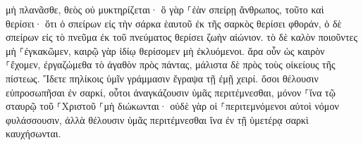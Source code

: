 \documentclass{openreader}
\begin{document}
μὴ πλανᾶσθε, θεὸς οὐ μυκτηρίζεται· ὃ γὰρ ⸀ἐὰν σπείρῃ ἄνθρωπος, τοῦτο καὶ θερίσει· 
ὅτι ὁ σπείρων εἰς τὴν σάρκα ἑαυτοῦ ἐκ τῆς σαρκὸς θερίσει φθοράν, ὁ δὲ σπείρων εἰς τὸ πνεῦμα ἐκ τοῦ πνεύματος θερίσει ζωὴν αἰώνιον. 
τὸ δὲ καλὸν ποιοῦντες μὴ ⸀ἐγκακῶμεν, καιρῷ γὰρ ἰδίῳ θερίσομεν μὴ ἐκλυόμενοι. 
ἄρα οὖν ὡς καιρὸν ⸀ἔχομεν, ἐργαζώμεθα τὸ ἀγαθὸν πρὸς πάντας, μάλιστα δὲ πρὸς τοὺς οἰκείους τῆς πίστεως. 
Ἴδετε πηλίκοις ὑμῖν γράμμασιν ἔγραψα τῇ ἐμῇ χειρί. 
ὅσοι θέλουσιν εὐπροσωπῆσαι ἐν σαρκί, οὗτοι ἀναγκάζουσιν ὑμᾶς περιτέμνεσθαι, μόνον ⸀ἵνα τῷ σταυρῷ τοῦ ⸀Χριστοῦ ⸀μὴ διώκωνται· 
οὐδὲ γὰρ οἱ ⸀περιτεμνόμενοι αὐτοὶ νόμον φυλάσσουσιν, ἀλλὰ θέλουσιν ὑμᾶς περιτέμνεσθαι ἵνα ἐν τῇ ὑμετέρᾳ σαρκὶ καυχήσωνται. 
\end{document}
